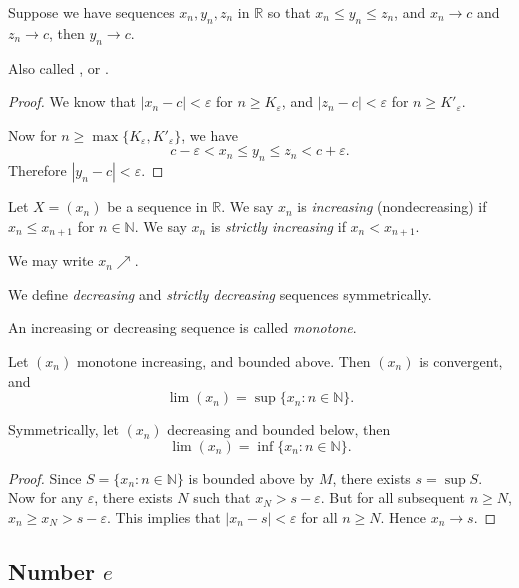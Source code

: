 \begin{theorem}
	Suppose we have sequences $x_n, y_n, z_n$ in $\mathbb{R}$ so that $x_n \le y_n \le z_n$, and $x_n \to c$ and $z_n \to c$, then $y_n \to c$.

	Also called , or .
\end{theorem}
\begin{proof}
	We know that $|x_n - c| < \varepsilon$ for $n \ge K_\varepsilon$, and $|z_n - c| < \varepsilon$ for $n \ge  K'_\varepsilon$.

	Now for $n \ge \max \{K_\varepsilon, K'_\varepsilon\} $, we have \[
		c-\varepsilon < x_n \le y_n \le z_n < c+\varepsilon
	.\] 
	Therefore $|y_n - c| < \varepsilon$.
\end{proof}

\begin{definition}
	Let $X = (x_n)$ be a sequence in $\mathbb{R}$. We say $x_n $ is \textit{increasing} (nondecreasing) if $x_n \le x_{n+1}$ for $n \in \mathbb{N}$. We say $x_n$ is \textit{strictly increasing} if $x_n < x_{n+1}$.

	We may write $x_n \nearrow$.

	We define \textit{decreasing} and \textit{strictly decreasing} sequences symmetrically.

	An increasing or decreasing sequence is called \textit{monotone}.
\end{definition}

\begin{theorem}
	Let $(x_n)$ monotone increasing, and bounded above. Then $(x_n)$ is convergent, and \[
		\lim (x_n) = \operatorname{sup} \{x_n: n \in \mathbb{N}\} 
	.\] 

	Symmetrically, let $(x_n)$ decreasing and bounded below, then \[
		\lim (x_n) = \operatorname{inf} \{x_n : n \in \mathbb{N}\} 
	.\] 
\end{theorem}
\begin{proof}
	Since $S = \{x_n : n \in \mathbb{N}\} $ is bounded above by $M$, there exists $s = \operatorname{sup} S$. Now for any $\varepsilon$, there exists $N$ such that $x_N > s - \varepsilon$. But for all subsequent $n \ge  N$, $x_n \ge x_N > s - \varepsilon$. This implies that $|x_n - s| < \varepsilon$ for all $n \ge N$. Hence $x_n \to  s$.
\end{proof}

\subsection{Number $e$ }

